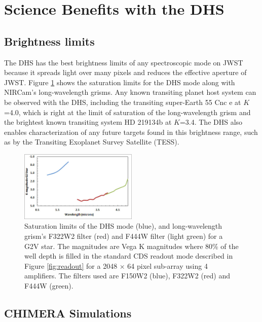 \documentclass[iop]{emulateapj}
\begin{document}
\section{Science Benefits with the DHS}\label{sec:addedScience}

\subsection{Brightness limits}\label{sec:brightness}

The DHS has the best brightness limits of any spectroscopic mode on JWST because it spreads light over many pixels and reduces the effective aperture of JWST.
Figure \ref{fig:DHSaps} shows the saturation limits for the DHS mode along with NIRCam's long-wavelength grisms.
Any known transiting planet host system can be observed with the DHS, including the transiting super-Earth  55 Cnc e \citep{mcarthur2004disc55cnce} at $K$=4.0, which is right at the limit of saturation of the long-wavelength grism and the brightest known transiting system HD 219134b \citep{motalebi2015hd219134b} at $K$=3.4.
The DHS also enables characterization of any future targets found in this brightness range, such as by the Transiting Exoplanet Survey Satellite (TESS).

\begin{figure}[!ht]
\includegraphics[width=0.5\textwidth]{sat_limits.jpg}
\caption{Saturation limits of the DHS mode (blue), and long-wavelength grism's F322W2 filter (red) and F444W filter (light green) for a G2V star.
The magnitudes are Vega K magnitudes where 80\% of the well depth is filled in the standard CDS readout mode described in Figure \ref{fig:readout}  for a 2048 $\times$ 64 pixel sub-array using 4 amplifiers.
The filters used are F150W2 (blue), F322W2 (red) and F444W (green).}\label{fig:DHSaps}
\end{figure}

\subsection{CHIMERA Simulations}\label{sec:simulations}
\end{document}
